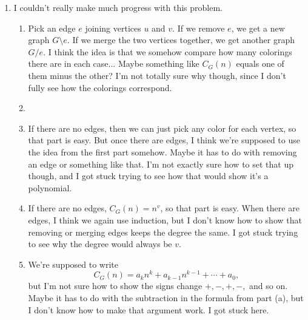 \documentclass[12pt]{article}
\begin{document}
\begin{enumerate}
\item I couldn't really make much progress with this problem.

\begin{enumerate}
\item Pick an edge $e$ joining vertices $u$ and $v$.
If we remove $e$, we get a new graph $G\setminus e$.  
If we merge the two vertices together, we get another graph $G/e$.  
I think the idea is that we somehow compare how many colorings there are in each case...  
Maybe something like $C_G(n)$ equals one of them minus the other?  
I’m not totally sure why though, since I don’t fully see how the colorings correspond.

\item 
\item If there are no edges, then we can just pick any color for each vertex, so that part is easy.  
But once there are edges, I think we’re supposed to use the idea from the first part somehow.  
Maybe it has to do with removing an edge or something like that.  
I’m not exactly sure how to set that up though, and I got stuck trying to see how that would show it’s a polynomial.

\item  
If there are no edges, $C_G(n)=n^v$, so that part is easy.  
When there are edges, I think we again use induction, but I don’t know how to show that removing or merging edges keeps the degree the same.  
I got stuck trying to see why the degree would always be $v$.

\item 
We’re supposed to write 
\[
C_G(n)=a_k n^k+a_{k-1}n^{k-1}+\cdots+a_0,
\]
but I’m not sure how to show the signs change $+,-,+,-,$ and so on.  
Maybe it has to do with the subtraction in the formula from part (a),  
but I don’t know how to make that argument work. I got stuck here.
\end{enumerate}


\end{enumerate}
\end{document}
